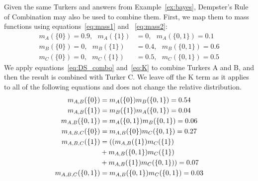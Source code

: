 {\begin{example}
\label{ex:DS}
Given the same Turkers and answers from Example~\ref{ex:bayes}, Dempster's Rule of Combination may also be used to combine them.  First, we map them to mass functions using equations~\ref{eq:mass1} and ~\ref{eq:mass2}:
\begin{align*}
m_{A}(\{0\}) = 0.9, \text{ } m_{A}(\{1\}) &= 0, \text{ } m_{A}(\{0,1\}) = 0.1\nonumber\\
m_{B}(\{0\}) = 0, \text{ } m_{B}(\{1\}) &= 0.4, \text{ } m_{B}(\{0,1\}) = 0.6\nonumber\\
m_{C}(\{0\}) = 0, \text{ } m_{C}(\{1\}) &= 0.5, \text{ } m_{C}(\{0,1\}) = 0.5
\end{align*}
We apply equations~\ref{eq:DS_combo} and~\ref{eq:K} to combine Turkers A and B, and then the result is combined with Turker C.  We leave off the K term as it applies to all of the following equations and does not change the relative distribution.
\begin{align*}
m_{A,B}(\{0\}) &= m_{A}(\{0\})m_{B}(\{0,1\}) = 0.54\nonumber\\
m_{A,B}(\{1\}) &= m_{B}(\{1\})m_{A}(\{0,1\}) = 0.04\nonumber\\
m_{A,B}(\{0,1\}) &= m_{A}(\{0,1\})m_{B}(\{0,1\}) = 0.06\nonumber\\
\vspace{2mm}
m_{A,B,C}(\{0\}) &= m_{A,B}(\{0\})m_{C}(\{0,1\}) = 0.27\nonumber\\
m_{A,B,C}(\{1\}) &= ((m_{A,B}(\{1\})m_{C}(\{1\})\nonumber\\
	 &+ m_{A,B}(\{0,1\})m_{C}(\{1\})\nonumber\\
	 &+ m_{A,B}(\{1\})m_{C}(\{0,1\})) = 0.07\nonumber\\
m_{A,B,C}(\{0,1\}) &= m_{A,B}(\{0,1\})m_{C}(\{0,1\}) = 0.03
\end{align*}
\end{example}

}
